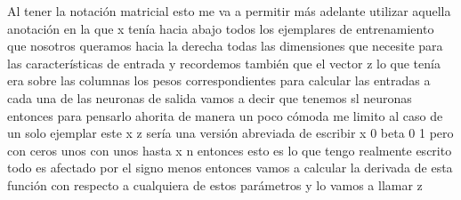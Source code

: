 Al tener la notación matricial esto me va a permitir más adelante utilizar aquella anotación en la que x tenía hacia abajo todos los ejemplares de entrenamiento que nosotros queramos hacia la derecha todas las dimensiones que necesite para las características de entrada y recordemos también que el vector z lo que tenía era sobre las columnas los pesos correspondientes para calcular las entradas a cada una de las neuronas de salida vamos a decir que tenemos sl neuronas entonces para pensarlo ahorita de manera un poco cómoda me limito al caso de un solo ejemplar este x z sería una versión abreviada de escribir x 0 beta 0 1 pero con ceros unos con unos hasta x n entonces esto es lo que tengo realmente escrito todo es afectado por el signo menos entonces vamos a calcular la derivada de esta función con respecto a cualquiera de estos parámetros y lo vamos a llamar z 
